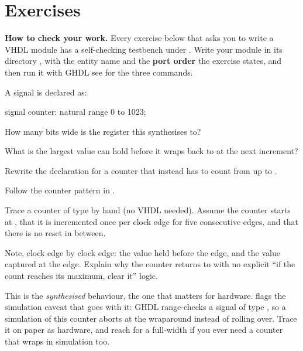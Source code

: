 
\section{Exercises}
\label{c6:sec:exercises}

\begin{aside}
\textbf{How to check your work.} Every exercise below that asks you to write a VHDL module has a
self-checking testbench under . Write your module in its directory
, with the entity name and the \textbf{port order} the exercise states,
and then run it with GHDL \textemdash{} see  for the three commands.
\end{aside}


\label{c6:ex:width}
A signal is declared as:

\begin{vhdlcode}
signal counter: natural range 0 to 1023;
\end{vhdlcode}

 How many bits wide is the register this synthesises to?

 What is the largest value  can hold before it wraps back to  at the
next increment?

 Rewrite the declaration for a counter that instead has to count from  up to
.

Follow the counter pattern in .

\label{c6:ex:trace}
Trace a counter of type  by hand (no VHDL needed). Assume the counter
starts at , that it is incremented once per clock edge for five consecutive edges, and that
there is no reset in between.

Note, clock edge by clock edge: the value held before the edge, and the value captured at the edge.
Explain why the counter returns to  with no explicit ``if the count reaches its maximum,
clear it'' logic.

\note[Note]This is the \emph{synthesised} behaviour, the one that matters for hardware.
 flags the simulation caveat that goes with it: GHDL range-checks a signal of
type , so a simulation of this counter aborts at the wraparound instead
of rolling over. Trace it on paper as hardware, and reach for a full-width  if you
ever need a counter that wraps in simulation too.

